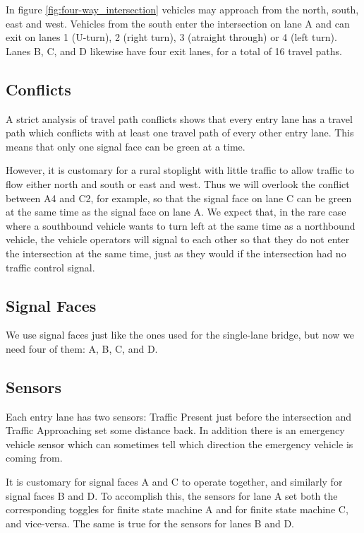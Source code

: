\documentclass[letterpaper,twoside]{article}
\begin{document}
In figure \ref{fig:four-way_intersection} vehicles may approach from the
north, south, east and west.  Vehicles from the south enter the intersection
on lane A and can exit on lanes 1 (U-turn), 2 (right turn), 3 (atraight
through) or 4 (left turn).  Lanes B, C, and D likewise have four exit
lanes, for a total of \num{16} travel paths.

\subsection{Conflicts}

A strict analysis of travel path conflicts shows that every entry lane
has a travel path which conflicts with at least one travel path of
every other entry lane.  This means that only one signal face can be
green at a time.

However, it is customary for a rural stoplight with little traffic to allow
traffic to flow either north and south or east and west.  
Thus we will overlook the conflict between A4 and C2, for example, so
that the signal face on lane C can be green at the same time as the
signal face on lane A.  We expect that, in the rare case where a southbound
vehicle wants to turn left at the same time as a northbound vehicle,
the vehicle operators will signal to each other so that they do not
enter the intersection at the same time, just as they would if the
intersection had no traffic control signal.

\subsection{Signal Faces}

We use signal faces just like the ones used for the single-lane
bridge, but now we need four of them: A, B, C, and D.

\subsection{Sensors}

Each entry lane has two sensors: Traffic Present just before the intersection
and Traffic Approaching set some distance back.  In addition there is an
emergency vehicle sensor which can sometimes tell which direction
the emergency vehicle is coming from.

It is customary for signal faces A and C to operate together,
and similarly for signal faces B and D.  To accomplish this, the sensors for
lane A set both the corresponding toggles for finite state machine
A and for finite state machine C, and vice-versa.
The same is true for the sensors for lanes B and D.
\end{document}
